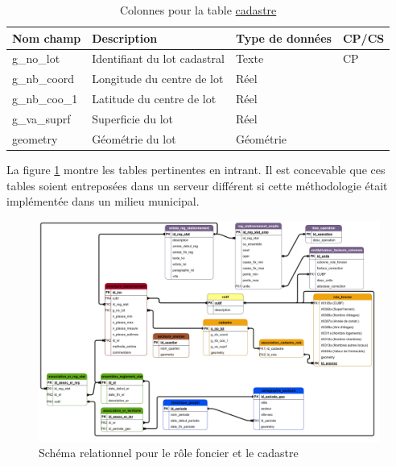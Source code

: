         \begin{table}[!h]
           \centering
           \begin{tabular}{m{}|m{}m{}m{}}
                \hline
                Nom champ       & Description                   & Type de données   & CP/CS  \\
                \hline
                g\_no\_lot      & Identifiant du lot cadastral  & Texte             & CP\\
                g\_nb\_coord    & Longitude du centre de lot    & Réel              & \\
                g\_nb\_coo\_1   & Latitude du centre de lot     & Réel              & \\
                g\_va\_suprf    & Superficie du lot             & Réel              & \\
                geometry        & Géométrie du lot              & Géométrie         & \\
                \hline
           \end{tabular}
           \caption{Colonnes pour la table \underline{cadastre}}
           \label{tab:definition_cadastre}
        \end{table}   
        La figure \ref{fig:offstreet_db_erd_input_data} montre les tables pertinentes en intrant. Il est concevable que ces tables soient entreposées dans un serveur différent si cette méthodologie était implémentée dans un milieu municipal.
        \begin{figure}[ht!]
            \centering
            \includegraphics[trim={110cm 50cm 0cm 49cm},clip,width=15cm]{dia/ERD_stationnement_propre.png}
            \caption{Schéma relationnel pour le rôle foncier et le cadastre}
            \label{fig:offstreet_db_erd_input_data}
        \end{figure}
        \FloatBarrier
